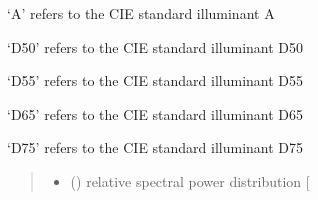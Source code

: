 \documentclass[letterpaper,10pt,english]{sphinxmanual}
\begin{document}
\begin{fulllineitems}
\begin{DUlineblock}{0em}
\item[] ‘A’ refers to the CIE standard illuminant A
\item[] ‘D50’ refers to the CIE standard illuminant D50
\item[] ‘D55’ refers to the CIE standard illuminant D55
\item[] ‘D65’ refers to the CIE standard illuminant D65
\item[] ‘D75’ refers to the CIE standard illuminant D75
\end{DUlineblock}
\begin{quote}\begin{description}
\sphinxAtStartPar
\begin{itemize}
\item {} 
\sphinxAtStartPar
{} () \textendash{} relative spectral power distribution {[}\sphinxhyphen{}{]}

\end{itemize}


\end{description}\end{quote}

\end{fulllineitems}

\end{document}
